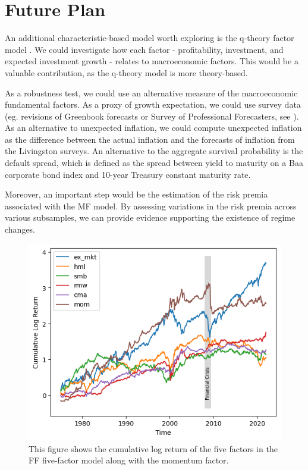 \documentclass[11pt,halfline,a4paper]{ouparticle}
\begin{document}
\section{Future Plan}
\label{plan}

An additional characteristic-based model worth exploring is the q-theory factor model \citep{hou2015digesting,hou2021augmented}. We could investigate how each factor - profitability, investment, and expected investment growth - relates to macroeconomic factors. This would be a valuable contribution, as the q-theory model is more theory-based. 

As a robustness test, we could use an alternative measure of the macroeconomic fundamental factors. As a proxy of growth expectation, we could use survey data (eg. revisions of Greenbook forecasts or Survey of Professional Forecasters, see \citealp{duffee2023macroeconomic}). As an alternative to unexpected inflation, we could compute unexpected inflation as the difference between the actual inflation and the forecasts of inflation from the Livingston surveys. An alternative to the aggregate survival probability is the default spread, which is defined as the spread between yield to maturity on a Baa corporate bond index and 10-year Treasury constant maturity rate.

Moreover, an important step would be the estimation of the risk premia associated with the MF model. By assessing variations in the risk premia across various subsamples, we can provide evidence supporting the existence of regime changes.



\newpage


%


\newpage


\begin{figure}[htb!]
    \centering
    \includegraphics[width=1\textwidth]{plots/cumret_ff.png}
    \caption{This figure shows the cumulative log return of the five factors in the FF five-factor model along with the momentum factor.}
    \label{fig:cumret_ff}
\end{figure}
\end{document}
